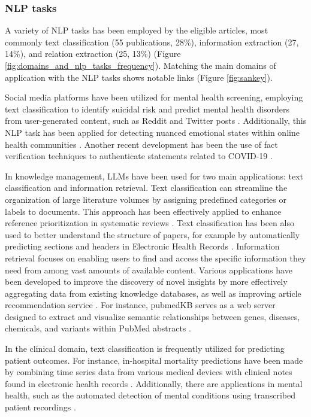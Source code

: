 \documentclass[fleqn,10pt]{olplainarticle}
\begin{document}
\subsubsection*{NLP tasks}

A variety of NLP tasks has been employed by the eligible articles, most commonly text classification (55 publications, 28\%), information extraction (27, 14\%), and relation extraction (25, 13\%) (Figure \ref{fig:domains_and_nlp_tasks_frequency}).
Matching the main domains of application with the NLP tasks shows notable links (Figure \ref{fig:sankey}). 

Social media platforms have been utilized for mental health screening, employing text classification to identify suicidal risk and predict mental health disorders from user-generated content, such as Reddit and Twitter posts \citep{zanwar2023fuse, sawhney2022risk, sawhney2020time}. Additionally, this NLP task has been applied for detecting nuanced emotional states within online health communities \citep{sosea2020canceremo}. Another recent development has been the use of fact verification techniques to authenticate statements related to COVID-19 \citep{hossain2020covidlies, liu2020adapting}.

In knowledge management, LLMs have been used for two main applications: text classification and information retrieval. Text classification can streamline the organization of large literature volumes by assigning predefined categories or labels to documents. This approach has been effectively applied to enhance reference prioritization in systematic reviews \citep{mantas2021classification, aum2021srbert, ambalavanan2020using, habets2022development, jimeno2023classifying}. Text classification has been also used to better understand the structure of papers, for example by automatically predicting sections and headers in Electronic Health Records \citep{rosenthal2019leveraging}. Information retrieval focuses on enabling users to find and access the specific information they need from among vast amounts of available content. Various applications have been developed to improve the discovery of novel insights by more effectively aggregating data from existing knowledge databases, as well as improving article recommendation service \citep{martenot2022lisa, kart2022emati}. For instance, pubmedKB serves as a web server designed to extract and visualize semantic relationships between genes, diseases, chemicals, and variants within PubMed abstracts \citep{li2022pubmedkb}.

In the clinical domain, text classification is frequently utilized for predicting patient outcomes. For instance, in-hospital mortality predictions have been made by combining time series data from various medical devices with clinical notes found in electronic health records \citep{zhang2022pm2f2n, deznabi2021predicting}. Additionally, there are applications in mental health, such as the automated detection of mental conditions using transcribed patient recordings \citep{duan2023cda, aich2022towards}.
\end{document}
